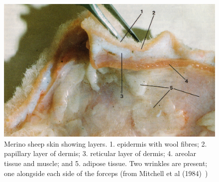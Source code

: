 %

\begin{figure}[!h]
  \centering
  \includegraphics[width=1.0\textwidth]{sanazcollagenwrinkle-img1.jpg}
  \caption{Merino sheep skin showing layers. 1. epidermis with wool fibres; 2. papillary layer of dermis; 3. reticular layer of dermis; 4. areolar tissue and muscle; and 5. adipose tissue. Two wrinkles are present; one alongside each side of the forceps (from Mitchell et al (1984)~\cite{mitc:84})}
  \label{fig:mitchell}
\end{figure}

%

